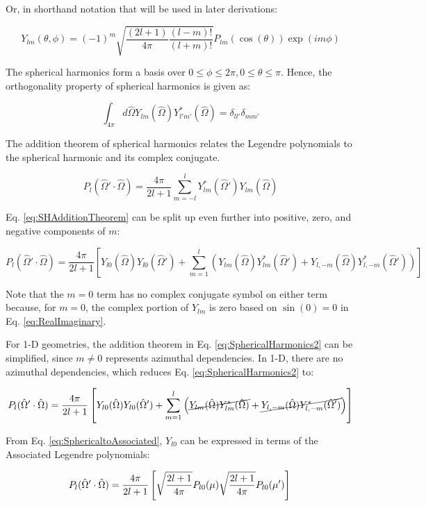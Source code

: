\documentclass[10pt]{article}
\newcommand{\beq}{\begin{equation}}
\newcommand{\eeq}{\end{equation}}
\newcommand{\hO}{\hat{\Omega}}
\begin{document}
\begin{flushleft}
Or, in shorthand notation that will be used in later derivations:

\beq
\label{eq:SphericaltoAssociatedShort}
Y_{lm}(\theta,\phi)=(-1)^m\sqrt{\frac{(2l+1)}{4\pi}\frac{(l-m)!}{(l+m)!}}P_{lm}(\cos{(\theta)})\exp{(im\phi)}
\eeq

The spherical harmonics form a basis over \(0\leq\phi\leq2\pi, 0\leq\theta\leq\pi\). Hence, the orthogonality property of spherical harmonics is given as:

\beq
\label{eq:SHOrthogonality}
\int_{4\pi}^{} d\hO   Y_{lm}(\hO  ) Y_{l'm'}^{*}(\hO  ) = \delta_{ll'}\delta_{mm'}
\eeq

The addition theorem of spherical harmonics relates the Legendre polynomials to the spherical harmonic and its complex conjugate. 

\beq
\label{eq:SHAdditionTheorem}
P_l(\hO  '\cdot\hO  ) = \frac{4\pi}{2l+1} \sum_{m=-l}^{l} Y_{lm}^{*} (\hO  ') Y_{lm}(\hO  )
\eeq

Eq. \eqref{eq:SHAdditionTheorem} can be split up even further into positive, zero, and negative components of \(m\):

\beq
\label{eq:SphericalHarmonics2}
P_l(\hO  '\cdot\hO  )=\frac{4\pi}{2l+1}\left\lbrack Y_{l0}(\hO  )Y_{l0}(\hO  ')+\sum_{m=1}^{l}\left(Y_{lm}(\hO  )Y_{lm}^*(\hO  ')+Y_{l,-m}(\hO  )Y_{l,-m}^*(\hO  ')\right)\right\rbrack
\eeq

Note that the \(m=0\) term has no complex conjugate symbol on either term because, for \(m=0\), the complex portion of \(Y_{lm}\) is zero based on \(\sin{(0)}=0\) in Eq. \eqref{eq:RealImaginary}. 

\begin{tcolorbox}[breakable]
For 1-D geometries, the addition theorem in Eq. \eqref{eq:SphericalHarmonics2} can be simplified, since \(m\neq0\) represents azimuthal dependencies. In 1-D, there are no azimuthal dependencies, which reduces Eq. \eqref{eq:SphericalHarmonics2} to:

\beq
\label{eq:SphericalHarmonics3}
P_l(\hO  '\cdot\hO  )=\frac{4\pi}{2l+1}\left\lbrack Y_{l0}(\hO  )Y_{l0}(\hO  ')+\sum_{m=1}^{l}\left(\cancel{Y_{lm}(\hO  )Y_{lm}^*(\hO  )}+\cancel{Y_{l,-m}(\hO  )Y_{l,-m}^*(\hO  ')}\right)\right\rbrack
\eeq

From Eq. \eqref{eq:SphericaltoAssociated}, \(Y_{l0}\) can be expressed in terms of the Associated Legendre polynomials:

\beq
\label{eq:SphericalHarmonics4}
P_l(\hO  '\cdot\hO  )=\frac{4\pi}{2l+1}\left\lbrack \sqrt{\frac{2l+1}{4\pi}}P_{l0}(\mu)\sqrt{\frac{2l+1}{4\pi}}P_{l0}(\mu')\right\rbrack\\
\eeq


\end{tcolorbox}
\end{flushleft}
\end{document}

